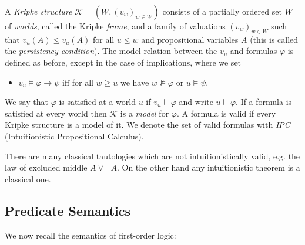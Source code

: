\documentclass[runningheads]{llncs}
\begin{document}
\begin{definition}
	A \emph{Kripke structure} $\mathcal K = (W, (v_w)_{w\in W})$ consists of a partially ordered set $W$ of \emph{worlds}, called the Kripke \emph{frame}, and a family of valuations $(v_w)_{w\in W}$ such that $v_u(A)\leq v_u(A)$ for all $u\leq w$ and propositional variables $A$ (this is called the \emph{persistency condition}).
	The model relation between the $v_u$ and formulas $\varphi$ is defined as before, except in the case of implications, where we set
	\begin{itemize}
		\item $v_u\models\varphi\to \psi$ iff for all $w\geq u$ we have $w\not\models\varphi$ or $u\models\psi$.
	\end{itemize}
	We say that $\varphi$ is satisfied at a world $u$ if $v_u\models\varphi$ and write $u\models\varphi$. If a formula is satisfied at every world then $\mathcal K$ is a \emph{model} for $\varphi$. A formula is valid if every Kripke structure is a model of it. We denote the set of valid formulas with \emph{IPC} (Intuitionistic Propositional Calculus).
\end{definition}
There are many classical tautologies which are not intuitionistically valid, e.g. the law of excluded middle $A\vee\neg A$. On the other hand any intuitionistic theorem is a classical one.

\subsection{Predicate Semantics}

We now recall the semantics of first-order logic:
\end{document}
